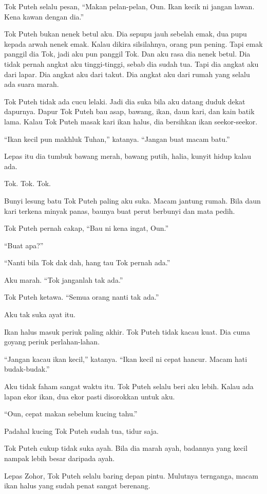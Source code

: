 \documentclass[
  11pt,
  a5paper,
  openany,
  oneside]{book}
\begin{document}
Tok Puteh selalu pesan, ``Makan pelan-pelan, Oun. Ikan kecik ni jangan
lawan. Kena kawan dengan dia.''

Tok Puteh bukan nenek betul aku. Dia sepupu jauh sebelah emak, dua pupu
kepada arwah nenek emak. Kalau dikira silsilahnya, orang pun pening.
Tapi emak panggil dia Tok, jadi aku pun panggil Tok. Dan aku rasa dia
nenek betul. Dia tidak pernah angkat aku tinggi-tinggi, sebab dia sudah
tua. Tapi dia angkat aku dari lapar. Dia angkat aku dari takut. Dia
angkat aku dari rumah yang selalu ada suara marah.

Tok Puteh tidak ada cucu lelaki. Jadi dia suka bila aku datang duduk
dekat dapurnya. Dapur Tok Puteh bau asap, bawang, ikan, daun kari, dan
kain batik lama. Kalau Tok Puteh masak kari ikan halus, dia bersihkan
ikan seekor-seekor.

``Ikan kecil pun makhluk Tuhan,'' katanya. ``Jangan buat macam batu.''

Lepas itu dia tumbuk bawang merah, bawang putih, halia, kunyit hidup
kalau ada.

Tok. Tok. Tok.

Bunyi lesung batu Tok Puteh paling aku suka. Macam jantung rumah. Bila
daun kari terkena minyak panas, baunya buat perut berbunyi dan mata
pedih.

Tok Puteh pernah cakap, ``Bau ni kena ingat, Oun.''

``Buat apa?''

``Nanti bila Tok dak dah, hang tau Tok pernah ada.''

Aku marah. ``Tok janganlah tak ada.''

Tok Puteh ketawa. ``Semua orang nanti tak ada.''

Aku tak suka ayat itu.

Ikan halus masuk periuk paling akhir. Tok Puteh tidak kacau kuat. Dia
cuma goyang periuk perlahan-lahan.

``Jangan kacau ikan kecil,'' katanya. ``Ikan kecil ni cepat hancur.
Macam hati budak-budak.''

Aku tidak faham sangat waktu itu. Tok Puteh selalu beri aku lebih. Kalau
ada lapan ekor ikan, dua ekor pasti disorokkan untuk aku.

``Oun, cepat makan sebelum kucing tahu.''

Padahal kucing Tok Puteh sudah tua, tidur saja.

Tok Puteh cukup tidak suka ayah. Bila dia marah ayah, badannya yang
kecil nampak lebih besar daripada ayah.

Lepas Zohor, Tok Puteh selalu baring depan pintu. Mulutnya ternganga,
macam ikan halus yang sudah penat sangat berenang.
\end{document}
